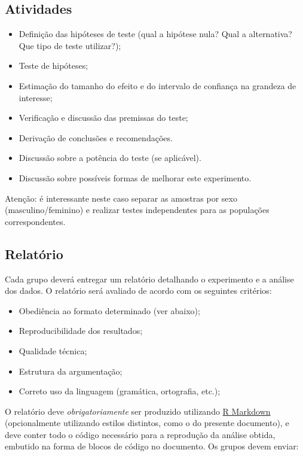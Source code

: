 \documentclass[11pt,twocolumn,printwatermark=false]{pinp}
\providecommand{\tightlist}{%
  \setlength{\itemsep}{0pt}\setlength{\parskip}{0pt}}
\begin{document}
\subsection{Atividades}\label{atividades}

\begin{itemize}
\tightlist
\item
  Definição das hipóteses de teste (qual a hipótese nula? Qual a
  alternativa? Que tipo de teste utilizar?);
\item
  Teste de hipóteses;
\item
  Estimação do tamanho do efeito e do intervalo de confiança na grandeza
  de interesse;
\item
  Verificação e discussão das premissas do teste;
\item
  Derivação de conclusões e recomendações.
\item
  Discussão sobre a potência do teste (se aplicável).
\item
  Discussão sobre possíveis formas de melhorar este experimento.
\end{itemize}

Atenção: é interessante neste caso separar as amostras por sexo
(masculino/feminino) e realizar testes independentes para as populações
correspondentes.

\subsection{Relatório}\label{relatorio}

Cada grupo deverá entregar um relatório detalhando o experimento e a
análise dos dados. O relatório será avaliado de acordo com os seguintes
critérios:

\begin{itemize}
\tightlist
\item
  Obediência ao formato determinado (ver abaixo);
\item
  Reproducibilidade dos resultados;
\item
  Qualidade técnica;
\item
  Estrutura da argumentação;
\item
  Correto uso da linguagem (gramática, ortografia, etc.);
\end{itemize}

O relatório deve \emph{obrigatoriamente} ser produzido utilizando
\href{http://rmarkdown.rstudio.com}{R Markdown} (opcionalmente
utilizando estilos distintos, como o do presente documento), e deve
conter todo o código necessário para a reprodução da análise obtida,
embutido na forma de blocos de código no documento. Os grupos devem
enviar:
\end{document}
